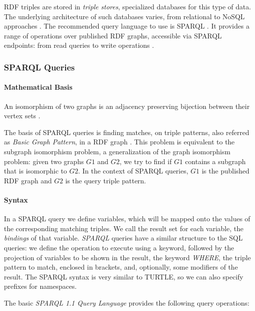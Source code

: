 \gls{RDF} triples are stored in \emph{triple stores}, specialized databases for this type of data. The underlying architecture of such databases varies, from relational to NoSQL approaches \autocite{Cure2014-vm, Modoni2014-cz}. The recommended query language to use is \gls{SPARQL} \autocite{W3c2013-hd}. It provides a range of operations over published \gls{RDF} graphs, accessible via SPARQL endpoints: from read queries \autocite{W3c2008-vf} to write operations \autocite{W3c_undated-tw, W3c2013-rr}.

\subsubsection{SPARQL Queries}

\paragraph{Mathematical Basis}
An isomorphism of two graphs is an adjacency preserving bijection between their vertex sets \autocite{McKay2014-zb}.

The basis of \gls{SPARQL} queries is finding matches, on triple patterns, also referred as \emph{Basic Graph Pattern}, in a \gls{RDF} graph \autocite{Ladwig2013-xp, Cure2014-vm}. This problem is equivalent to the subgraph isomorphism problem, a generalization of the graph isomorphism problem: given two graphs $G1$ and $G2$, we try to find if $G1$ contains a subgraph that is isomorphic to $G2$. In the context of \gls{SPARQL} queries, $G1$ is the published \gls{RDF} graph and $G2$ is the query triple pattern. 

\paragraph{Syntax}

In a \gls{SPARQL} query we define variables, which will be mapped onto the values of the corresponding matching triples. We call the result set for each variable, the \emph{bindings} of that variable. \emph{SPARQL} queries have a similar structure to the \gls{SQL} queries: we define the operation to execute using a keyword, followed by the projection of variables to be shown in the result, the keyword \emph{WHERE}, the triple pattern to match, enclosed in brackets, and, optionally, some modifiers of the result. The \gls{SPARQL} syntax is very similar to \gls{TURTLE}, so we can also specify prefixes for namespaces. 

The basic \emph{\gls{SPARQL} 1.1 Query Language} \autocite{W3c2008-vf} provides the following query operations: 


